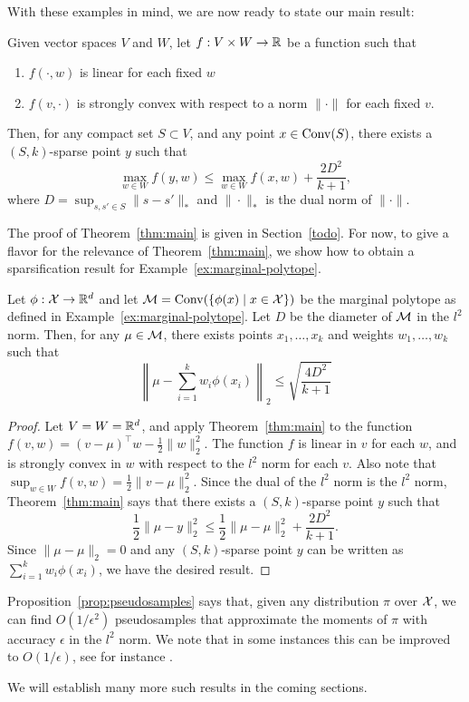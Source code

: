 \documentclass[paper.tex]{subfiles}
\begin{document}
With these examples in mind, we are now ready to state our main result:
\begin{theorem}
\label{thm:main}
Given vector spaces $V$ and $W$, let $f : V \times W \to \mathbb{R}$ be a function 
such that 
\begin{enumerate}
\item $f(\cdot,w)$ is linear for each fixed $w$
\item $f(v, \cdot)$ is strongly convex with respect to a norm $\|\cdot\|$ 
      for each fixed $v$.
\end{enumerate}
Then, for any compact set $S \subset V$, and any point $x \in \operatorname{Conv}(S)$, 
there exists a $(S,k)$-sparse point $y$ such that 
\[ \max_{w \in W} f(y,w) \leq \max_{w \in W} f(x,w) + \frac{2D^2}{k+1}, \]
where $D = \sup_{s, s' \in S} \|s-s'\|_*$ and $\|\cdot\|_*$ is the dual norm 
of $\|\cdot\|$.
\end{theorem}
The proof of Theorem~\ref{thm:main} is given in Section~\ref{todo}. For now, 
to give a flavor for the relevance of Theorem~\ref{thm:main}, we show how 
to obtain a sparsification result for Example~\ref{ex:marginal-polytope}.
\begin{proposition}
\label{prop:pseudosamples}
Let $\phi : \mathcal{X} \to \mathbb{R}^d$ and let $\mathcal{M} = \operatorname{Conv}(\{\phi(x) \mid x \in \mathcal{X}\})$ 
be the marginal polytope as defined in Example~\ref{ex:marginal-polytope}. 
Let $D$ be the diameter of $\mathcal{M}$ in the $l^2$ norm. Then, for any 
$\mu \in \mathcal{M}$, there exists points $x_1,\ldots,x_k$ and weights 
$w_1,\ldots,w_k$ such that
\[ \left\|\mu - \sum_{i=1}^k w_i \phi(x_i)\right\|_2 \leq \sqrt{\frac{4D^2}{k+1}} \]
\end{proposition}
\begin{proof}
Let $V = W = \mathbb{R}^d$, and apply Theorem~\ref{thm:main} to the function 
$f(v,w) = (v-\mu)^{\top}w - \frac{1}{2}\|w\|_2^2$. The function $f$ is 
linear in $v$ for each $w$, and is strongly convex in $w$ with respect to the 
$l^2$ norm for each $v$. Also note that 
$\sup_{w \in W} f(v,w) = \frac{1}{2}\|v-\mu\|_2^2$. Since the dual of the 
$l^2$ norm is the $l^2$ norm, Theorem~\ref{thm:main} says that there exists 
a $(S,k)$-sparse point $y$ such that
\[ \frac{1}{2}\|\mu - y\|_2^2 \leq \frac{1}{2}\|\mu - \mu\|_2^2 + \frac{2D^2}{k+1}. \]
Since $\|\mu-\mu\|_2 = 0$ and any $(S,k)$-sparse point $y$ can be written 
as $\sum_{i=1}^k w_i \phi(x_i)$, we have the desired result.
\end{proof}
Proposition~\ref{prop:pseudosamples} says that, given any distribution 
$\pi$ over $\mathcal{X}$, we can find $O(1/\epsilon^2)$ pseudosamples that approximate 
the moments of $\pi$ with accuracy $\epsilon$ in the $l^2$ norm. We note 
that in some instances this can be improved to $O(1/\epsilon)$, see 
for instance \cite{chen}.

We will establish many more such results in the coming sections.
\end{document}
